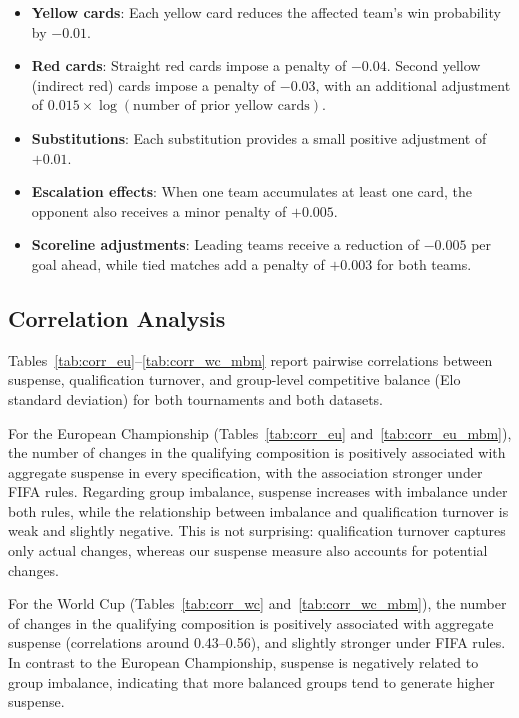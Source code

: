 \documentclass[11pt]{article}
\begin{document}
\begin{itemize}
    \item \textbf{Yellow cards}: Each yellow card reduces the affected team's win probability by $-0.01$.
    \item \textbf{Red cards}: Straight red cards impose a penalty of $-0.04$. Second yellow (indirect red) cards impose a penalty of $-0.03$, with an additional adjustment of $0.015 \times \log(\text{number of prior yellow cards})$.
    \item \textbf{Substitutions}: Each substitution provides a small positive adjustment of $+0.01$.
    \item \textbf{Escalation effects}: When one team accumulates at least one card, the opponent also receives a minor penalty of $+0.005$.
    \item \textbf{Scoreline adjustments}: Leading teams receive a reduction of $-0.005$ per goal ahead, while tied matches add a penalty of $+0.003$ for both teams.
\end{itemize}


\subsection{Correlation Analysis}
\label{app:correlations}

Tables~\ref{tab:corr_eu}--\ref{tab:corr_wc_mbm} report pairwise correlations between suspense, qualification turnover, and group-level competitive balance (Elo standard deviation) for both tournaments and both datasets.

For the European Championship (Tables~\ref{tab:corr_eu} and~\ref{tab:corr_eu_mbm}), the number of changes in the qualifying composition is positively associated with aggregate suspense in every specification, with the association stronger under FIFA rules. Regarding group imbalance, suspense increases with imbalance under both rules, while the relationship between imbalance and qualification turnover is weak and slightly negative. This is not surprising: qualification turnover captures only actual changes, whereas our suspense measure also accounts for potential changes.




For the World Cup (Tables~\ref{tab:corr_wc} and~\ref{tab:corr_wc_mbm}), the number of changes in the qualifying composition is positively associated with aggregate suspense (correlations around 0.43--0.56), and slightly stronger under FIFA rules. In contrast to the European Championship, suspense is negatively related to group imbalance, indicating that more balanced groups tend to generate higher suspense.
\end{document}
